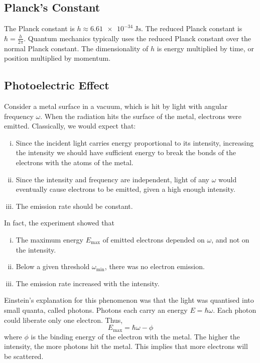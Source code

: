 \subsection{Planck's Constant}
The Planck constant is \( h \approx \SI{6.61e-34}{\joule\second} \).
The reduced Planck constant is \( \hbar = \frac{h}{2\pi} \).
Quantum mechanics typically uses the reduced Planck constant over the normal Planck constant.
The dimensionality of \( h \) is energy multiplied by time, or position multiplied by momentum.

\subsection{Photoelectric Effect}
Consider a metal surface in a vacuum, which is hit by light with angular frequency \( \omega \).
When the radiation hits the surface of the metal, electrons were emitted.
Classically, we would expect that:
\begin{enumerate}[(i)]
	\item Since the incident light carries energy proportional to its intensity, increasing the intensity we should have sufficient energy to break the bonds of the electrons with the atoms of the metal.
	\item Since the intensity and frequency are independent, light of any \( \omega \) would eventually cause electrons to be emitted, given a high enough intensity.
	\item The emission rate should be constant.
\end{enumerate}
In fact, the experiment showed that
\begin{enumerate}[(i)]
	\item The maximum energy \( E_{\max} \) of emitted electrons depended on \( \omega \), and not on the intensity.
	\item Below a given threshold \( \omega_{\min} \), there was no electron emission.
	\item The emission rate increased with the intensity.
\end{enumerate}
Einstein's explanation for this phenomenon was that the light was quantised into small quanta, called photons.
Photons each carry an energy \( E = \hbar \omega \).
Each photon could liberate only one electron.
Thus,
\[
	E_{\max} = \hbar \omega - \phi
\]
where \( \phi \) is the binding energy of the electron with the metal.
The higher the intensity, the more photons hit the metal.
This implies that more electrons will be scattered.

